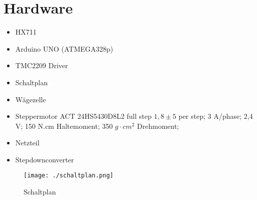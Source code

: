 \section{Hardware}
\label{sec:Hardware}



\begin{itemize}
    \item HX711
    \item Arduino UNO (ATMEGA328p)
    \item TMC2209 Driver
    \item Schaltplan
    \item Wägezelle
    \item Steppermotor ACT 24HS5430D8L2
    full step $1,8 \pm 5$ per step;
    3 A/phase;
    2,4 V;
    150 N.cm Haltemoment;
    350 $g \cdot cm^2$ Drehmoment;
    \item Netzteil
    \item Stepdownconverter
\end{itemize}




\begin{figure}[H]
    \centering
    \texttt{[image: ./schaltplan.png]}
    \caption{Schaltplan}
    \label{fig:schaltplan}
\end{figure}





